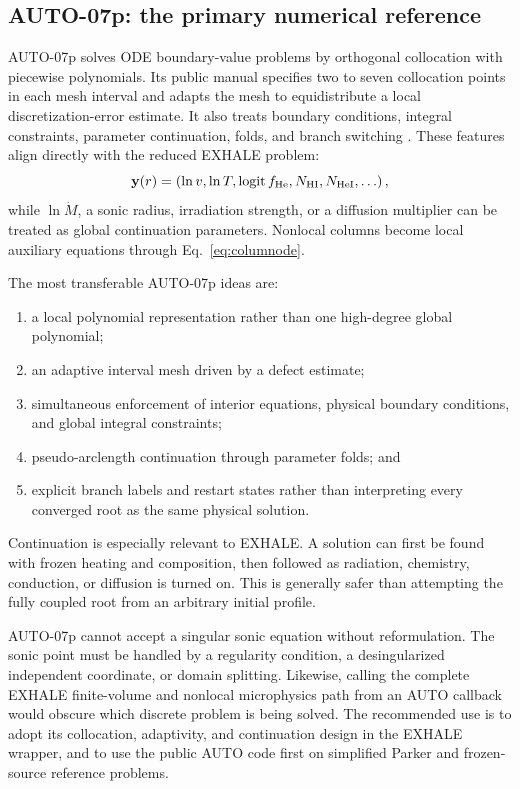 \documentclass[english,a4paper]{my_memo}
\newcommand{\vect}[1]{\mathbf{#1}}
\newcommand{\mdot}{\dot M}
\begin{document}
\subsection{AUTO-07p: the primary numerical reference}

AUTO-07p solves ODE boundary-value problems by orthogonal collocation with
piecewise polynomials.  Its public manual specifies two to seven collocation
points in each mesh interval and adapts the mesh to equidistribute a local
discretization-error estimate.  It also treats boundary conditions, integral
constraints, parameter continuation, folds, and branch switching
\cite{Doedel2021}.  These features align directly with the reduced EXHALE
problem:
\begin{equation}
 \vect{y}(r)=
 \left(\ln v,\ln T,\operatorname{logit}f_{\rm He},N_{\rm HI},
 N_{\rm HeI},\ldots\right),
 \label{eq:autostate}
\end{equation}
while \(\ln\mdot\), a sonic radius, irradiation strength, or a diffusion
multiplier can be treated as global continuation parameters.  Nonlocal columns
become local auxiliary equations through Eq.~\eqref{eq:columnode}.

The most transferable AUTO-07p ideas are:
\begin{enumerate}
\item a local polynomial representation rather than one high-degree global
  polynomial;
\item an adaptive interval mesh driven by a defect estimate;
\item simultaneous enforcement of interior equations, physical boundary
  conditions, and global integral constraints;
\item pseudo-arclength continuation through parameter folds; and
\item explicit branch labels and restart states rather than interpreting every
  converged root as the same physical solution.
\end{enumerate}
Continuation is especially relevant to EXHALE.  A solution can first be found
with frozen heating and composition, then followed as radiation, chemistry,
conduction, or diffusion is turned on.  This is generally safer than attempting
the fully coupled root from an arbitrary initial profile.

AUTO-07p cannot accept a singular sonic equation without reformulation.  The
sonic point must be handled by a regularity condition, a desingularized
independent coordinate, or domain splitting.  Likewise, calling the complete
EXHALE finite-volume and nonlocal microphysics path from an AUTO callback would
obscure which discrete problem is being solved.  The recommended use is to
adopt its collocation, adaptivity, and continuation design in the EXHALE wrapper,
and to use the public AUTO code first on simplified Parker and frozen-source
reference problems.
\end{document}
